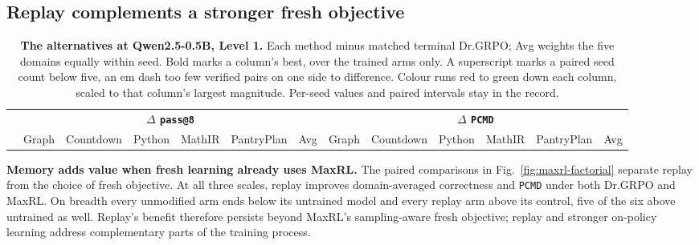 \documentclass{article}
\newcommand{\1}{\mathbf 1}
\newcommand{\pmd}{\texttt{PCMD}}
\theoremstyle{remark}
\theoremstyle{definition}
\theoremstyle{plain}
\begin{document}
\subsection{Replay complements a stronger fresh objective}
\label{sec:results-maxrl}

\begin{table}[!tbp]
  \centering
  \caption{\textbf{The alternatives at Qwen2.5-0.5B, Level 1.} Each method minus
  matched terminal Dr.GRPO; Avg weights the five domains equally within seed.
  Bold marks a column's best, over the trained arms only. A superscript marks a
  paired seed count below five, an em dash too few verified pairs on one side
  to difference. Colour runs red to green down each column, scaled to that
  column's largest magnitude. Per-seed values and paired intervals stay in
  the record.}
  \label{tab:direct-comparator-matrix}
  \scriptsize
  \setlength{\tabcolsep}{1.4pt}
  \renewcommand{\arraystretch}{0.92}
  \begin{tabular}{@{}l*{12}{r}@{}}
    \toprule
    & \multicolumn{6}{c}{\textbf{$\Delta$ \texttt{pass@8}}}
      & \multicolumn{6}{c}{\textbf{$\Delta$ \pmd{}}} \\
    \cmidrule(lr){2-7}\cmidrule(l){8-13}
    & Graph & Countdown & Python & MathIR & PantryPlan & Avg
      & Graph & Countdown & Python & MathIR & PantryPlan & Avg \\
    \midrule
    
  \end{tabular}
\end{table}

\textbf{Memory adds value when fresh learning already uses MaxRL.}
The paired comparisons in Fig.~\ref{fig:maxrl-factorial} separate replay
from the choice of fresh objective. At all three scales, replay improves
domain-averaged correctness and \pmd{} under both Dr.GRPO and MaxRL. On
breadth every unmodified arm ends below its untrained model and every replay
arm above its control, five of the six above untrained as well. Replay's
benefit therefore persists beyond MaxRL's sampling-aware fresh objective;
replay and stronger on-policy learning address complementary parts of the
training process.
\end{document}
